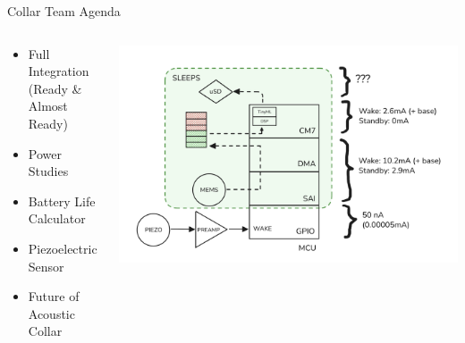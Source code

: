 \begin{frame}{Collar Team Agenda}
    \begin{columns}
        \begin{column}{0.5\textwidth}
            \begin{itemize}
                \item Full Integration (Ready \& Almost Ready)
                \item Power Studies
                \item Battery Life Calculator
                \item Piezoelectric Sensor
                \item Future of Acoustic Collar
            \end{itemize}
        \end{column}
        \begin{column}{0.5\textwidth}
            \includegraphics[height=1\textheight,width=1\textwidth,keepaspectratio]{images/FullSystemDiagram.png}
        \end{column}
    \end{columns}
\end{frame}

